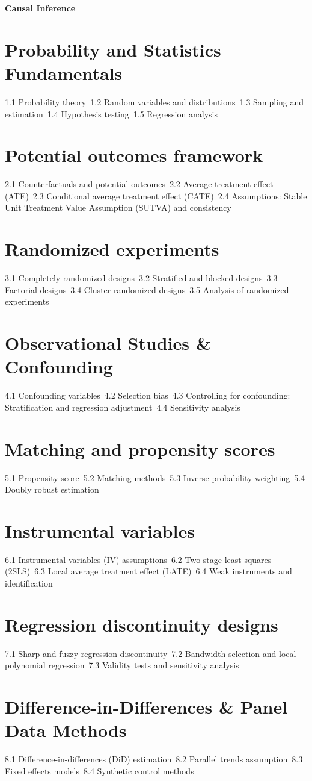 {\LARGE \bf{Causal Inference}}
\section{Probability and Statistics Fundamentals}
1.1 Probability theory\
1.2 Random variables and distributions\
1.3 Sampling and estimation\
1.4 Hypothesis testing\
1.5 Regression analysis\
\section{Potential outcomes framework}
2.1 Counterfactuals and potential outcomes\
2.2 Average treatment effect (ATE)\
2.3 Conditional average treatment effect (CATE)\
2.4 Assumptions: Stable Unit Treatment Value Assumption (SUTVA) and consistency\
\section{Randomized experiments}
3.1 Completely randomized designs\
3.2 Stratified and blocked designs\
3.3 Factorial designs\
3.4 Cluster randomized designs\
3.5 Analysis of randomized experiments\
\section{Observational Studies \& Confounding}
4.1 Confounding variables\
4.2 Selection bias\
4.3 Controlling for confounding: Stratification and regression adjustment\
4.4 Sensitivity analysis\
\section{Matching and propensity scores}
5.1 Propensity score\
5.2 Matching methods\
5.3 Inverse probability weighting\
5.4 Doubly robust estimation\
\section{Instrumental variables}
6.1 Instrumental variables (IV) assumptions\
6.2 Two-stage least squares (2SLS)\
6.3 Local average treatment effect (LATE)\
6.4 Weak instruments and identification\
\section{Regression discontinuity designs}
7.1 Sharp and fuzzy regression discontinuity\
7.2 Bandwidth selection and local polynomial regression\
7.3 Validity tests and sensitivity analysis\
\section{Difference-in-Differences \& Panel Data Methods}
8.1 Difference-in-differences (DiD) estimation\
8.2 Parallel trends assumption\
8.3 Fixed effects models\
8.4 Synthetic control methods\
